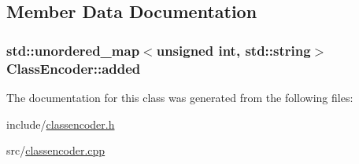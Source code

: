 \subsection{Member Data Documentation}
\hypertarget{classClassEncoder_adcdcf6dc84a1c3ca056f3687b2d3688c}{}
\subsubsection[{added}]{\setlength{\rightskip}{0pt plus 5cm}std\+::unordered\+\_\+map$<$unsigned int, std\+::string$>$ Class\+Encoder\+::added}\label{classClassEncoder_adcdcf6dc84a1c3ca056f3687b2d3688c}


The documentation for this class was generated from the following files\+:\begin{DoxyCompactItemize}
\item 
include/\hyperlink{classencoder_8h}{classencoder.\+h}\item 
src/\hyperlink{classencoder_8cpp}{classencoder.\+cpp}\end{DoxyCompactItemize}
